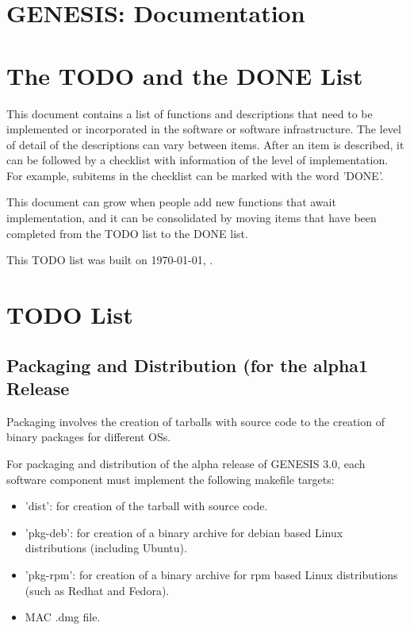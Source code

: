 \documentclass[12pt]{article}
\begin{document}
\section*{GENESIS: Documentation}

\section{The TODO and the DONE List}

This document contains a list of functions and descriptions that need
to be implemented or incorporated in the software or software
infrastructure.  The level of detail of the descriptions can vary
between items.  After an item is described, it can be followed by a
checklist with information of the level of implementation.  For
example, subitems in the checklist can be marked with the word 'DONE'.

This document can grow when people add new functions that await
implementation, and it can be consolidated by moving items that have
been completed from the TODO list to the DONE list.

This TODO list was built on \today, \thistime.


\section{TODO List}

\subsection{Packaging and Distribution (for the alpha1 Release}

Packaging involves the creation of tarballs with source code to the
creation of binary packages for different OSs.

For packaging and distribution of the alpha release of GENESIS 3.0,
each software component must implement the following makefile targets:

\begin{itemize}
\item 'dist': for creation of the tarball with source code.
\item 'pkg-deb': for creation of a binary archive for debian based
  Linux distributions (including Ubuntu).
\item 'pkg-rpm': for creation of a binary archive for rpm based Linux
  distributions (such as Redhat and Fedora).
\item MAC .dmg file.
\end{itemize}
\end{document}
